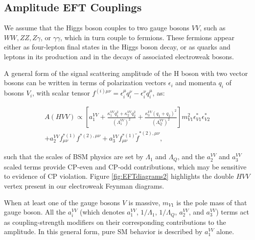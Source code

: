 \subsection{Amplitude EFT Couplings}

We assume that the Higgs boson couples to two gauge bosons $VV$, such as $WW, ZZ, Z\gamma$, or $\gamma\gamma$, which in turn couple to fermions. These fermions appear either as four-lepton final states in the Higgs boson decay, or as quarks and leptons in its production and in the decays of associated electroweak bosons.

A general form of the signal scattering amplitude of the H boson with two vector bosons can be written in terms of polarization vectors $\epsilon_i$ and momenta $q_i$ of bosons $V_i$, with scalar tensor $f^{(i){\mu \nu}} = \epsilon_{i}^{\mu}q_{i}^{\nu} - \epsilon_{i}^\nu q_{i}^{\mu}$, as:

\begin{equation}
\label{eq:formfact-fullampl-spin0}
\begin{gathered}
A(HVV)\propto
\left[ a_{1}^{VV}
+ \frac{\kappa_1^{VV}q_{1}^2 + \kappa_2^{VV} q_{2}^{2}}{\left(\Lambda_{1}^{VV} \right)^{2}}
+ \frac{\kappa_3^{VV}(q_{1} + q_{2})^{2}}{\left(\Lambda_{Q}^{VV} \right)^{2}}
\right]
m_{V1}^2 \epsilon_{V1}^* \epsilon_{V2}^* \\
+ a_{2}^{VV}  f_{\mu \nu}^{*(1)}f^{*(2),\mu\nu}
+ a_{3}^{VV}   f^{*(1)}_{\mu \nu} {\tilde f}^{*(2),\mu\nu},
\end{gathered}
\end{equation}

such that the scales of BSM physics are set by $\Lambda_{1}$ and $\Lambda_{Q}$, and the $a_{2}^{VV}$ and $a_{3}^{VV}$ scaled terms provide CP-even and CP-odd contributions, which may be sensitive to evidence of CP violation. Figure \ref{fig:EFTdiagrams2} highlights the double $HVV$ vertex present in our electroweak Feynman diagrams.

When at least one of the gauge bosons $V$ is massive, $m_{V1}$ is the pole mass of that gauge boson. All the $a_i^{VV}$ (which denotes $a_{1}^{VV}$, $1/\Lambda_{1}$, $1/\Lambda_{Q}$, $a_{2}^{VV}$, and $a_{3}^{VV}$) terms act as coupling-strength modifiers on their corresponding contributions to the amplitude. In this general form, pure SM behavior is described by $a_{1}^{VV}$ alone.


